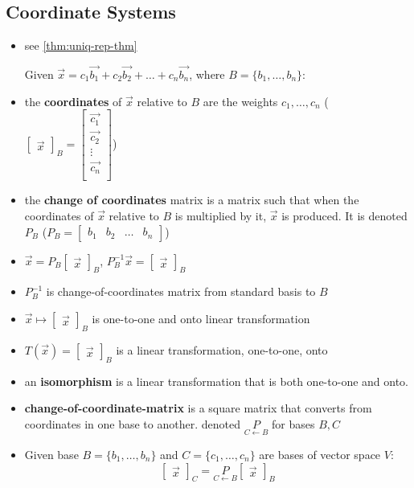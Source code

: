 \documentclass[a4paper,12pt]{article}
\theoremstyle{definition}
\theoremstyle{definition}
\newcommand{\mateq}[3]{#1#2 = #3}
\newcommand{\finitevecs}[2]{#1_1,\ldots,#1_#2}
\newcommand{\finitevecsset}[2]{\{\finitevecs{#1}{#2}\}}
\newcommand{\finiteadd}[3]{#1 + #2 + \ldots + #3}
\newcommand{\basiscoord}[2]{
	\begin{bmatrix}
		\vec{#1}
	\end{bmatrix}_#2
}
\newcommand{\chngbasismat}[2]{
	\underset{#2 \leftarrow #1}{P}
}
\begin{document}
	\subsection{Coordinate Systems}
	\begin{itemize}
		\item see \autoref{thm:uniq-rep-thm}
		
		Given $\vec{x} = \finiteadd{c_1\vec{b_1}}{c_2\vec{b_2}}{c_n\vec{b_n}}$, where $B = \finitevecsset{b}{n}$:
		
		\item the \textbf{coordinates} of $\vec{x}$ relative to $B$ are the weights $\finitevecs{c}{n}$ ($\basiscoord{x}{B}
		=
		\begin{bmatrix}
			\vec{c_1}\\
			\vec{c_2}\\
			\vdots\\
			\vec{c_n}\\
		\end{bmatrix}$)
		
		\item the \textbf{change of coordinates} matrix is a matrix such that when the coordinates of $\vec{x}$ relative to $B$ is multiplied by it, $\vec{x}$ is produced. It is denoted $P_B$ ($P_B =
		\begin{bmatrix}
			b_1 & b_2 & \ldots &b_n
		\end{bmatrix}$)
		
		\item $\vec{x} = P_B\basiscoord{x}{B}$, $P^{-1}_B\vec{x} = \basiscoord{x}{B}$
		
		\item $P^{-1}_B$ is change-of-coordinates matrix from standard basis to $B$
		
		\item $\vec{x} \mapsto \basiscoord{x}{B}$ is one-to-one and onto linear transformation
		
		\item $\mateq{T}{(\vec{x})}{\basiscoord{x}{B}}$ is a linear transformation, one-to-one, onto
		
		\item an \textbf{isomorphism} is a linear transformation that is both one-to-one and onto.
		
		\item \textbf{change-of-coordinate-matrix} is a square matrix that converts from coordinates in one base to another. denoted $\chngbasismat{B}{C}$ for bases $B, C$
		
		\item Given base $B = \finitevecsset{b}{n}$ and $C = \finitevecsset{c}{n}$ are bases of vector space $V$:
		\begin{equation*}
			\basiscoord{x}{C} = \chngbasismat{B}{C}\basiscoord{x}{B}
		\end{equation*}
		

\end{itemize}
\end{document}
